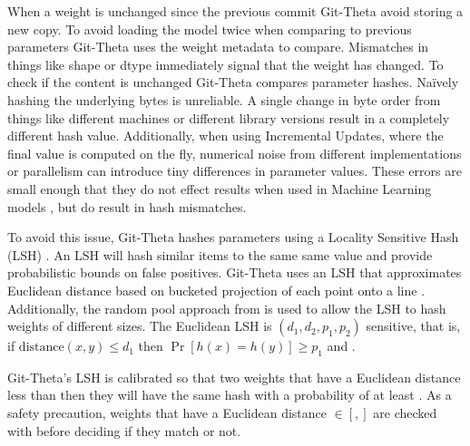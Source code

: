 When a weight is unchanged since the previous commit Git-Theta avoid storing a new copy. To avoid loading the model twice when comparing to previous parameters Git-Theta uses the weight metadata to compare. Mismatches in things like shape or dtype immediately signal that the weight has changed. To check if the content is unchanged Git-Theta compares parameter hashes. Na\"{i}vely hashing the underlying bytes is unreliable. A single change in byte order from things like different machines or different library versions result in a completely different hash value. Additionally, when using Incremental Updates, where the final value is computed on the fly, numerical noise from different implementations or parallelism can introduce tiny differences in parameter values. These errors are small enough that they do not effect results when used in Machine Learning models , but do result in hash mismatches.

To avoid this issue, Git-Theta hashes parameters using a Locality Sensitive Hash (LSH) . An LSH will hash similar items to the same same value and provide probabilistic bounds on false positives. Git-Theta uses an LSH that approximates Euclidean distance based on bucketed projection of each point onto a line . Additionally, the random pool approach from  is used to allow the LSH to hash weights of different sizes. The Euclidean LSH is $(d_1, d_2, p_1, p_2)$  sensitive, that is, if $\text{distance}(x, y) \leq d_1$ then $\Pr[h(x) = h(y)] \geq p_1$ and .

Git-Theta's LSH is calibrated so that two weights that have a Euclidean distance less than  then they will have the same hash with a probability of at least . As a safety precaution, weights that have a Euclidean distance $\in [, ]$  are checked with  before deciding if they match or not.


